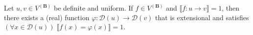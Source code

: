 Let $u, v \in V^{(\mathbf{B})}$ be definite and uniform. If $f \in V^{(\mathbf{B})}$ and $\llbracket f: u \to v \rrbracket = 1$, then there exists a (real) function $\varphi: \mathcal{D}(u) \to \mathcal{D}(v)$ that is extensional and satisfies $(\forall x \in \mathcal{D}(u))\; \llbracket f(x) = \varphi(x) \rrbracket = 1$.
